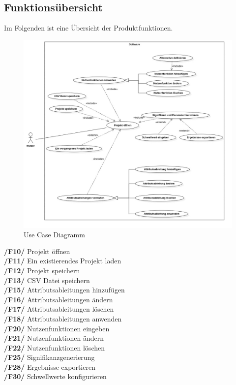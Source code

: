 \documentclass{article}
\begin{document}
\subsection{Funktionsübersicht}
Im Folgenden ist eine Übersicht der Produktfunktionen.
\begin{figure}[H]%
  \centering
  \includegraphics[width=15cm]{img/use-case/use case5.jpg}
  \caption{Use Case Diagramm}
\end{figure} 
\newpage
\textbf{/F10/} Projekt öffnen \\
\textbf{/F11/} Ein existierendes Projekt laden \\
\textbf{/F12/} Projekt speichern \\
\textbf{/F13/} CSV Datei speichern \\
\textbf{/F15/} Attributsableitungen hinzufügen \\
\textbf{/F16/} Attributsableitungen ändern \\
\textbf{/F17/} Attributsableitungen löschen \\
\textbf{/F18/} Attributsableitungen anwenden \\
\textbf{/F20/} Nutzenfunktionen eingeben \\
\textbf{/F21/} Nutzenfunktionen ändern \\
\textbf {/F22/} Nutzenfunktionen löschen \\
\textbf{/F25/} Signifikanzgenerierung \\
\textbf{/F28/} Ergebnisse exportieren \\
\textbf{/F30/} Schwellwerte konfigurieren
\\[0.5in]
\end{document}

